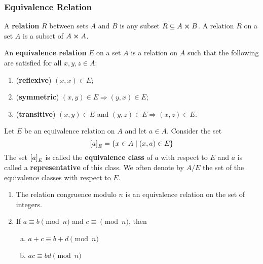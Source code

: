 \subsubsection{Equivalence Relation}

\begin{definition}[Relation]
    A \textbf{relation} $R$ between sets $A$ and $B$ is any subset $R \subseteq A \cross B$. A relation $R$ on a set $A$ is a subset of $A \cross A$.
\end{definition}

\begin{definition}
    An \textbf{equivalence relation} $E$ on a set $A$ is a relation on $A$ such that the following are satisfied for all $x, y, z \in A$:
    \begin{enumerate}
        \item (\textbf{reflexive}) $(x, x) \in E$;
        \item (\textbf{symmetric}) $(x, y) \in E \Rightarrow (y, x) \in E$;
        \item (\textbf{transitive}) $(x, y) \in E$ and $(y, z) \in E \Rightarrow (x, z) \in E$.
    \end{enumerate}
\end{definition}

\begin{definition}
    Let $E$ be an equivalence relation on $A$ and let $a \in A$. Consider the set 
    \[ \qty[a]_{E} = \qty{x \in A \mid \qty(x, a) \in E}\]
    The set $\qty[a]_{E}$ is called the \textbf{equivalence class} of $a$ with respect to $E$ and $a$ is called a \textbf{representative} of this class. We often denote by $A/E$ the set of the equivalence classes with respect to $E$.
\end{definition}

\begin{remark} \phantom{blank}
    \begin{enumerate}
        \item The relation congruence modulo $n$ is an equivalence relation on the set of integers.
        \item If $ a \equiv b \pmod{n}$ and $c \equiv \pmod{n}$, then
        \begin{enumerate}[(a)]
            \item $a + c \equiv b + d \pmod{n}$
            \item $ac \equiv bd \pmod{n}$
        \end{enumerate}
    \end{enumerate}
\end{remark}


